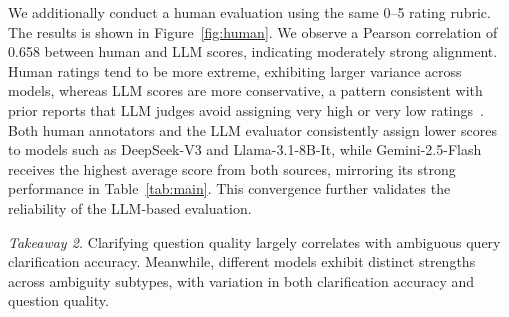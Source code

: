 \documentclass[sigconf]{acmart}
\begin{document}
We additionally conduct a human evaluation using the same 0–5 rating rubric.
The results is shown in Figure~\ref{fig:human}. We observe a Pearson correlation of 0.658 between human and LLM scores, indicating moderately strong alignment.
Human ratings tend to be more extreme, exhibiting larger variance across models, whereas LLM scores are more conservative, a pattern consistent with prior reports that LLM judges avoid assigning very high or very low ratings~\cite{li2025generation}.
Both human annotators and the LLM evaluator consistently assign lower scores to models such as DeepSeek-V3 and Llama-3.1-8B-It, while Gemini-2.5-Flash receives the highest average score from both sources, mirroring its strong performance in Table~\ref{tab:main}.
This convergence further validates the reliability of the LLM-based evaluation.

\textit{Takeaway 2.}
Clarifying question quality largely correlates with ambiguous query clarification accuracy. 
Meanwhile, different models exhibit distinct strengths across ambiguity subtypes, with variation in both clarification accuracy and question quality.
















\end{document}
